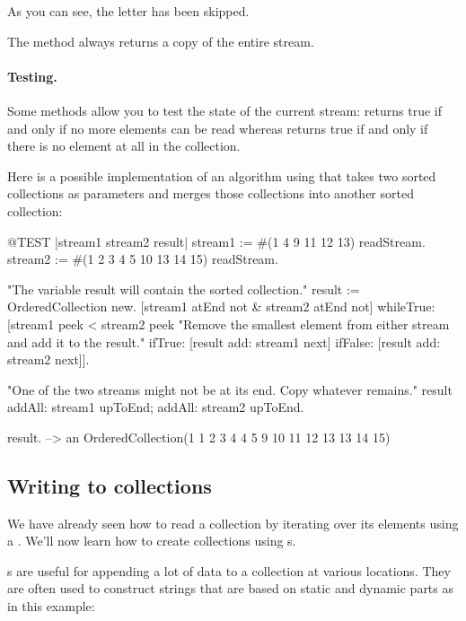 \documentclass[a4paper,10pt,twoside]{book}
\begin{document}
As you can see, the letter  has been skipped.

The method  always returns a copy of the entire stream.

\paragraph{Testing.} Some methods allow you to test the state of the current stream:
 returns true if and only if no more elements can be read whereas  returns true if and only if there is no element at all in the collection.

Here is a possible implementation of an algorithm using  that takes two sorted collections as parameters and merges those collections into another sorted collection:

\begin{code}{@TEST |stream1 stream2 result|}
stream1 := #(1 4 9 11 12 13) readStream.
stream2 := #(1 2 3 4 5 10 13 14 15) readStream.

"The variable result will contain the sorted collection."
result := OrderedCollection new.
[stream1 atEnd not & stream2 atEnd not]
  whileTrue: [stream1 peek < stream2 peek
    "Remove the smallest element from either stream and add it to the result."
    ifTrue: [result add: stream1 next]
    ifFalse: [result add: stream2 next]].

"One of the two streams might not be at its end. Copy whatever remains."
result
  addAll: stream1 upToEnd;
  addAll: stream2 upToEnd.

result. -->   an OrderedCollection(1 1 2 3 4 4 5 9 10 11 12 13 13 14 15)
\end{code}

\subsection{Writing to collections}

We have already seen how to read a collection by iterating over its
elements using a . We'll now learn how to create
collections using s.

s are useful for appending a lot of data to a collection at various locations. They are often used to construct strings that are based on static and dynamic parts as in this example:
\end{document}
